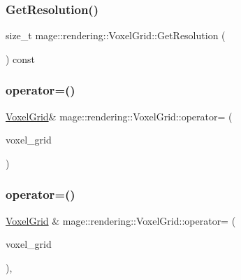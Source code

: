 \subsubsection{\texorpdfstring{Get\+Resolution()}{GetResolution()}}
{\footnotesize\ttfamily size\+\_\+t mage\+::rendering\+::\+Voxel\+Grid\+::\+Get\+Resolution (\begin{DoxyParamCaption}{ }\end{DoxyParamCaption}) const\hspace{0.3cm}{\ttfamily [noexcept]}}

\mbox{\label{classmage_1_1rendering_1_1_voxel_grid_a90b94d3a00e365e1a03d1077a5c79a11}} 
\subsubsection{\texorpdfstring{operator=()}{operator=()}\hspace{0.1cm}{\footnotesize\ttfamily [1/2]}}
{\footnotesize\ttfamily \mbox{\hyperlink{classmage_1_1rendering_1_1_voxel_grid}{Voxel\+Grid}}\& mage\+::rendering\+::\+Voxel\+Grid\+::operator= (\begin{DoxyParamCaption}\item[{const \mbox{\hyperlink{classmage_1_1rendering_1_1_voxel_grid}{Voxel\+Grid}} \&}]{voxel\+\_\+grid }\end{DoxyParamCaption})\hspace{0.3cm}{\ttfamily [delete]}}

\mbox{\label{classmage_1_1rendering_1_1_voxel_grid_a9e0ae3de8c583879a3db8b6d787138ac}} 
\subsubsection{\texorpdfstring{operator=()}{operator=()}\hspace{0.1cm}{\footnotesize\ttfamily [2/2]}}
{\footnotesize\ttfamily \mbox{\hyperlink{classmage_1_1rendering_1_1_voxel_grid}{Voxel\+Grid}} \& mage\+::rendering\+::\+Voxel\+Grid\+::operator= (\begin{DoxyParamCaption}\item[{\mbox{\hyperlink{classmage_1_1rendering_1_1_voxel_grid}{Voxel\+Grid}} \&\&}]{voxel\+\_\+grid }\end{DoxyParamCaption})\hspace{0.3cm}{\ttfamily [default]}, {\ttfamily [noexcept]}}

